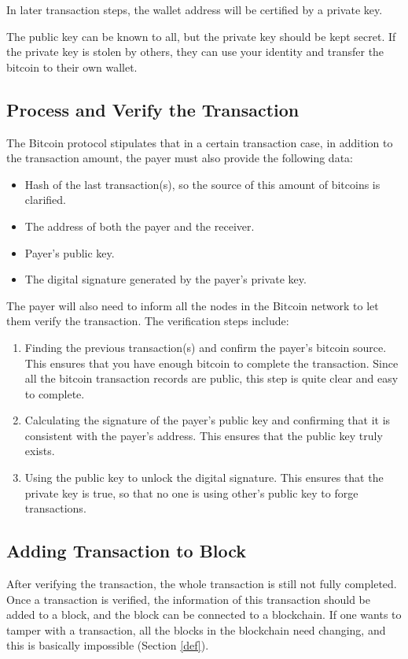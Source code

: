 \documentclass[12pt,a4paper]{article}
\begin{document}
In later transaction steps, the wallet address will be certified by a private key.

The public key can be known to all, but the private key should be kept secret. If the private key is stolen by others, they can use your identity and transfer the bitcoin to their own wallet.

\subsection{Process and Verify the Transaction} 
The Bitcoin protocol stipulates that in a certain transaction case, in addition to the transaction amount, the payer must also provide the following data:
\begin{itemize}
\item Hash of the last transaction(s), so the source of this amount of bitcoins is clarified.
\item The address of both the payer and the receiver.
\item Payer's public key.
\item The digital signature generated by the payer's private key.
\end{itemize}

The payer will also need to inform all the nodes in the Bitcoin network to let them verify the transaction. The verification steps include:
\begin{enumerate}
	\item Finding the previous transaction(s) and confirm the payer's bitcoin source. This ensures that you have enough bitcoin to complete the transaction. Since all the bitcoin transaction records are public, this step is quite clear and easy to complete.
 	\item Calculating the signature of the payer's public key and confirming that it is consistent with the payer's address. This ensures that the public key truly exists.
	\item Using the public key to unlock the digital signature. This ensures that the private key is true, so that no one is using other's public key to forge transactions.
\end{enumerate}

\subsection{Adding Transaction to Block} 
After verifying the transaction, the whole transaction is still not fully completed. 
Once a transaction is verified, the information of this transaction should be added to a block, and the block can be connected to a blockchain. If one wants to tamper with a transaction, all the blocks in the blockchain need changing, and this is basically impossible (Section \ref{def}). 
\end{document}
